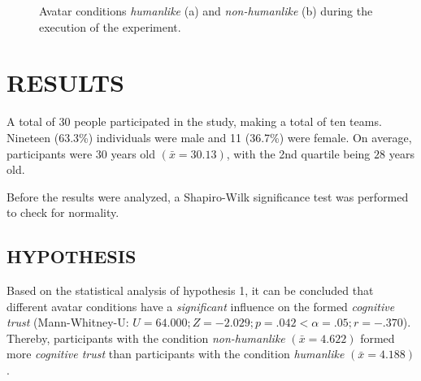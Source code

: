 \documentclass[sigchi]{acmart}
\begin{document}
\begin{figure}[H]
  \centering
  \qquad
  \caption[The avatars in the experimental environment]{Avatar conditions \textit{humanlike} (a) and \textit{non-humanlike} (b) during the execution of the experiment.}
  \label{AvatareImEinsatz}
\end{figure}

\section{RESULTS}
A total of 30 people participated in the study, making a total of ten teams. Nineteen (63.3\%) individuals were male and 11 (36.7\%) were female. On average, participants were 30 years old $(\bar{x} = 30.13)$, with the 2nd quartile being $28$ years old.

Before the results were analyzed, a Shapiro-Wilk significance test was performed to check for normality.
\subsection{HYPOTHESIS}
Based on the statistical analysis of hypothesis 1, it can be concluded that different avatar conditions have a \textit{significant} influence on the formed \textit{cognitive trust} (Mann-Whitney-U: $U = 64.000; Z = -2.029; p =.042 < \alpha =.05; r =-.370$). Thereby, participants with the condition \textit{non-humanlike} $(\bar{x} = 4.622)$ formed more \textit{cognitive trust} than participants with the condition \textit{humanlike} $(\bar{x} = 4.188)$. 
\end{document}
